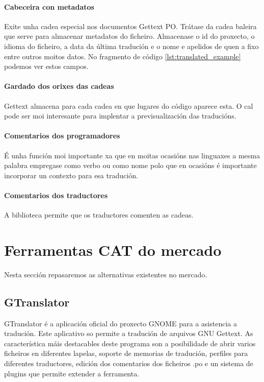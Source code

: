 \paragraph {Cabeceira con metadatos}
Exite unha cadea especial nos documentos Gettext PO. Trátase da cadea baleira que serve para almacenar metadatos do ficheiro. Almacenase o id do proxecto, o idioma do ficheiro, a data da última tradución e o nome e apelidos de quen a fixo entre outros moitos datos. No fragmento de código \ref{lst:translated_example} podemos ver estos campos.

\paragraph{Gardado dos orixes das cadeas}
Gettext almacena para cada cadea en que lugares do código aparece esta. O cal pode ser moi interesante para implentar a previsualización das traducións.

\paragraph{Comentarios dos programadores}
É unha función moi importante xa que en moitas ocasións nas linguaxes a mesma palabra empregase como verbo ou como nome polo que en ocasións é importante incorporar un contexto para esa tradución.

\paragraph{Comentarios dos traductores}
A biblioteca permite que os traductores comenten as cadeas.

\section{Ferramentas CAT do mercado}

Nesta sección repasaremos as alternativas existentes no mercado.

\subsection{GTranslator}
GTranslator é a aplicación oficial do proxecto GNOME para a asistencia a tradución. Este aplicativo so permite a tradución de arquivos GNU Gettext. As característica máis destacables deste programa son a posibilidade de abrir varios ficheiros en diferentes lapelas, soporte de memorias de tradución, perfiles para diferentes traductores, edición dos comentarios dos ficheiros .po e un sistema de plugins que permite extender a ferramenta.

